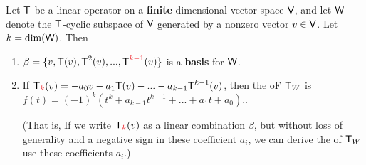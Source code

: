 \begin{theorem} \label{thm 5.21}
Let \(\textsf{T}\) be a linear operator on a \textbf{finite}-dimensional vector space \(\textsf{V}\), and let \(\textsf{W}\) denote the \(\textsf{T}\)-cyclic subspace of \(\textsf{V}\) generated by a nonzero vector \(v \in \textsf{V}\).
Let \(k = \dim(\textsf{W})\).
Then
\begin{enumerate}
\item \(\beta = \{ v, \T(v), \T^2(v), ..., \T^{\RED{k - 1}}(v) \}\) is a \textbf{basis} for \(\textsf{W}\).
\item If \(\T_{\RED{k}}(v) = -a_0 v - a_1 \T(v) - ... - a_{k - 1} \T^{k - 1}(v) \), then the \CPOLY{} oF \(\textsf{T}_W\) is \(f(t) = (-1)^k (t^k + a_{k - 1} t^{k-1} + ... + a_1 t + a_0).\).

(That is, If we write \(\T_{\RED{k}}(v)\) as a linear combination \(\beta\), but without loss of generality and a negative sign in these coefficient \(a_i\), we can derive the \CPOLY{} of \(\textsf{T}_W\) use these coefficients \(a_i\).)
\end{enumerate}
\end{theorem}

